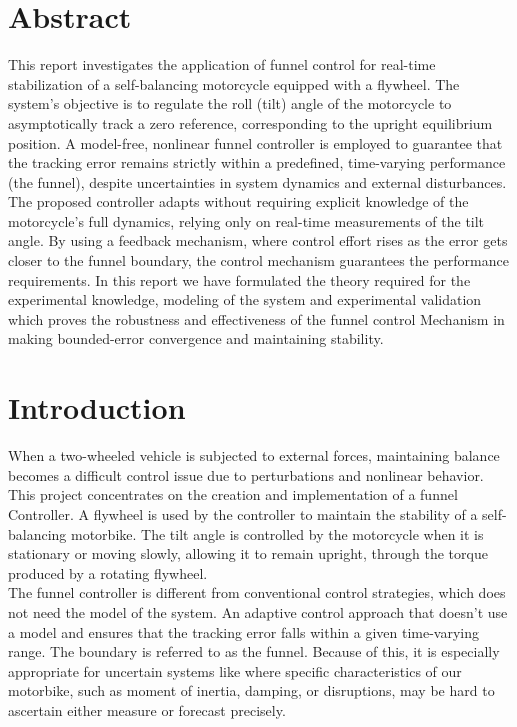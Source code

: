 \documentclass{article}
\begin{document}
\section*{Abstract}
This report investigates the application of funnel control for real-time stabilization of a self-balancing motorcycle equipped with a flywheel. The system's objective is to regulate the roll (tilt) angle of the motorcycle to asymptotically track a zero reference, corresponding to the upright equilibrium position. A model-free, nonlinear funnel controller is employed to guarantee that the tracking error remains strictly within a predefined, time-varying performance (the funnel), despite uncertainties in system dynamics and external disturbances. The proposed controller adapts without requiring explicit knowledge of the motorcycle’s full dynamics, relying only on real-time measurements of the tilt angle. By using a  feedback mechanism, where control effort rises as the error gets closer to the funnel boundary, the control mechanism guarantees the performance requirements. In this report we have formulated the theory required for the experimental knowledge, modeling of the system and experimental validation which proves the robustness and effectiveness of the funnel control Mechanism in making bounded-error convergence and maintaining stability.



\newpage
{
  \hypersetup{linkcolor=black}
  \tableofcontents
}




\newpage
\section{Introduction}
When a two-wheeled vehicle is subjected to external forces, maintaining balance becomes a difficult control issue due to perturbations and nonlinear behavior. This project concentrates on the creation and implementation of a funnel Controller. A flywheel is used by the controller to maintain the stability of a self-balancing motorbike. The tilt angle is controlled by the motorcycle when it is stationary or moving slowly, allowing it to remain upright, through the torque produced by a rotating flywheel.\\


The funnel controller is different from conventional control strategies, which does not need the model of the system. An adaptive control approach that doesn't use a model and ensures that the tracking error falls within a given time-varying range. The boundary is referred to as the funnel. Because of this, it is especially appropriate for uncertain systems like where specific characteristics of our motorbike, such as moment of inertia, damping, or disruptions, may be hard to ascertain either measure or forecast precisely.\\
\end{document}
